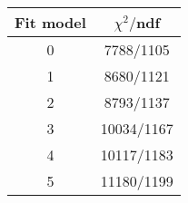 \begin{tabular}{c|c}
Fit model & $\chi^2/$ndf \\
\hline
0 & 7788/1105\\
1 & 8680/1121\\
2 & 8793/1137\\
3 & 10034/1167\\
4 & 10117/1183\\
5 & 11180/1199\\
\end{tabular}
